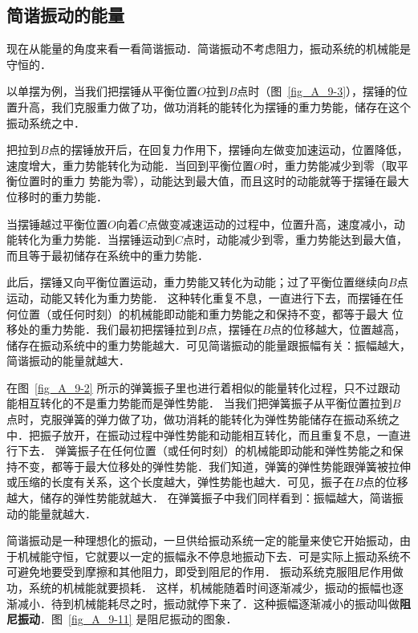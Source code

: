 \subsection{简谐振动的能量}

现在从能量的角度来看一看简谐振动．简谐振动不考虑阻力，振动系统的机械能是守恒的．

以单摆为例，当我们把摆锤从平衡位置$O$拉到$B$点时（图~\ref{fig_A_9-3}），摆锤的位置升高，我们克服重力做了功，做功消耗的能转化为摆锤的重力势能，储存在这个振动系统之中．

把拉到$B$点的摆锤放开后，在回复力作用下，摆锤向左做变加速运动，位置降低，速度增大，重力势能转化为动能．当回到平衡位置$O$时，重力势能减少到零（取平衡位置时的重力
势能为零），动能达到最大值，而且这时的动能就等于摆锤在最大位移时的重力势能．

当摆锤越过平衡位置$O$向着$C$点做变减速运动的过程中，位置升高，速度减小，动能转化为重力势能．当摆锤运动到$C$点时，动能减少到零，重力势能达到最大值，而且等于最初储存在系统中的重力势能．

此后，摆锤又向平衡位置运动，重力势能又转化为动能；过了平衡位置继续向$B$点运动，动能又转化为重力势能．
这种转化重复不息，一直进行下去，而摆锤在任何位置（或任何时刻）的机械能即动能和重力势能之和保持不变，都等于最大
位移处的重力势能．我们最初把摆锤拉到$B$点，摆锤在$B$点的位移越大，位置越高，储存在振动系统中的重力势能越大．可见简谐振动的能量跟振幅有关：振幅越大，简谐振动的能量就越大．

在图~\ref{fig_A_9-2} 所示的弹簧振子里也进行着相似的能量转化过程，只不过跟动能相互转化的不是重力势能而是弹性势能．
当我们把弹簧振子从平衡位置拉到$B$点时，克服弹簧的弹力做了功，做功消耗的能转化为弹性势能储存在振动系统之中．把振子放开，在振动过程中弹性势能和动能相互转化，而且重复不息，一直进行下去．
弹簧振子在任何位置（或任何时刻）的机械能即动能和弹性势能之和保持不变，都等于最大位移处的弹性势能．我们知道，弹簧的弹性势能跟弹簧被拉伸或压缩的长度有关系，这个长度越大，弹性势能也越大．可见，振子在$B$点的位移越大，储存的弹性势能就越大．
在弹簧振子中我们同样看到：振幅越大，简谐振动的能量就越大．

简谐振动是一种理想化的振动，一旦供给振动系统一定的能量来使它开始振动，由于机械能守恒，它就要以一定的振幅永不停息地振动下去．可是实际上振动系统不可避免地要受到摩擦和其他阻力，即受到阻尼的作用．
振动系统克服阻尼作用做功，系统的机械能就要损耗．
这样，机械能随着时间逐渐减少，振动的振幅也逐渐减小．待到机械能耗尽之时，振动就停下来了．这种振幅逐渐减小的振动叫做\textbf{阻尼振动}．图~\ref{fig_A_9-11} 是阻尼振动的图象．

